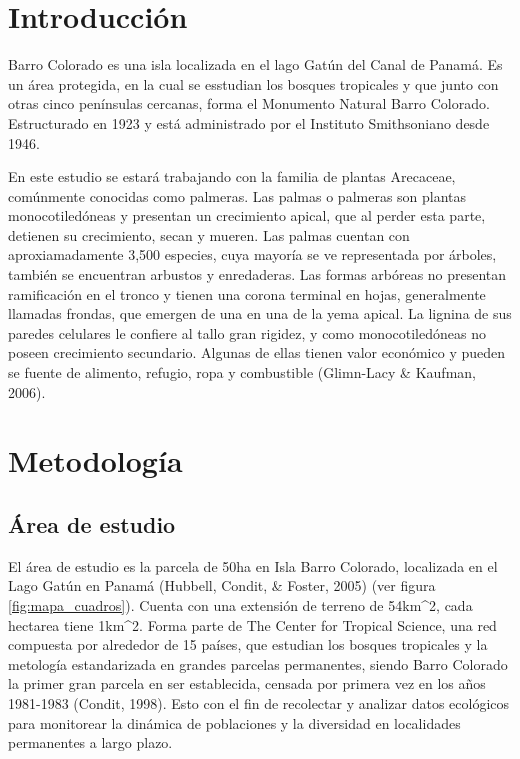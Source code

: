 \documentclass[11pt,]{article}
\begin{document}
\noindent  \section{Introducción}\label{introducciuxf3n}

Barro Colorado es una isla localizada en el lago Gatún del Canal de
Panamá. Es un área protegida, en la cual se esstudian los bosques
tropicales y que junto con otras cinco penínsulas cercanas, forma el
Monumento Natural Barro Colorado. Estructurado en 1923 y está
administrado por el Instituto Smithsoniano desde 1946.

En este estudio se estará trabajando con la familia de plantas
Arecaceae, comúnmente conocidas como palmeras. Las palmas o palmeras son
plantas monocotiledóneas y presentan un crecimiento apical, que al
perder esta parte, detienen su crecimiento, secan y mueren. Las palmas
cuentan con aproxiamadamente 3,500 especies, cuya mayoría se ve
representada por árboles, también se encuentran arbustos y enredaderas.
Las formas arbóreas no presentan ramificación en el tronco y tienen una
corona terminal en hojas, generalmente llamadas frondas, que emergen de
una en una de la yema apical. La lignina de sus paredes celulares le
confiere al tallo gran rigidez, y como monocotiledóneas no poseen
crecimiento secundario. Algunas de ellas tienen valor económico y pueden
se fuente de alimento, refugio, ropa y combustible (Glimn-Lacy \&
Kaufman, 2006).

\section{Metodología}\label{metodologuxeda}

\subsection{Área de estudio}\label{uxe1rea-de-estudio}

El área de estudio es la parcela de 50ha en Isla Barro Colorado,
localizada en el Lago Gatún en Panamá (Hubbell, Condit, \& Foster, 2005)
(ver figura \ref{fig:mapa_cuadros}). Cuenta con una extensión de terreno
de 54km\^{}2, cada hectarea tiene 1km\^{}2. Forma parte de The Center
for Tropical Science, una red compuesta por alrededor de 15 países, que
estudian los bosques tropicales y la metología estandarizada en grandes
parcelas permanentes, siendo Barro Colorado la primer gran parcela en
ser establecida, censada por primera vez en los años 1981-1983 (Condit,
1998). Esto con el fin de recolectar y analizar datos ecológicos para
monitorear la dinámica de poblaciones y la diversidad en localidades
permanentes a largo plazo.
\end{document}
